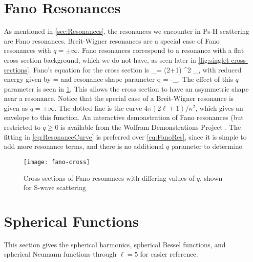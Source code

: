 \documentclass[Dissertation.tex]{subfiles}
\begin{document}
\section{Fano Resonances}
\label{sec:FanoResonances}
As mentioned in \cref{sec:Resonances}, the resonances we encounter in Ps-H
scattering are Fano resonances. Breit-Wigner resonances are a special case of Fano
resonances with $q = \pm\infty$.
Fano resonances correspond to a resonance with a flat cross section 
background, which we do not have, as seen later in \cref{fig:singlet-cross-sections}.
Fano's equation for the cross section is \cite[p.596]{Bransden2003}
\beq
\label{eq:FanoRes}
\sigma_\ell =  (2\ell+1) \sin^2 \xi_\ell {},
\eeq
with reduced energy given by
\beq
\epsilon = 
\eeq
and resonance shape parameter
\beq
q = -\cot \xi_\ell.
\eeq
The effect of this $q$ parameter is seen in \cref{fig:FanoCross}. This allows 
the cross section to have an asymmetric shape near a resonance. Notice that 
the special case of a Breit-Wigner resonance is given as $q = \pm\infty$. The 
dotted line is the curve $4 \pi (2\ell+1) / \kappa^2$, which gives an 
envelope to this function. An interactive demonstration of Fano resonances
(but restricted to $q \geq 0$ is available from the Wolfram Demonstrations
Project \cite{FanoDemo}. The fitting in \cref{eq:ResonanceCurve} is preferred
over \cref{eq:FanoRes}, since it is simple to add more resonance terms,
and there is no additional $q$ parameter to determine.

\begin{figure}
	\centering
	\texttt{[image: fano-cross]}
	\caption[Cross sections of Fano resonances]{Cross sections of Fano 
resonances with differing values of $q$, shown for S-wave scattering}
	\label{fig:FanoCross}
\end{figure}


\section{Spherical Functions}
\label{sec:SphericalFunc}
%

This section gives the spherical harmonics, spherical Bessel functions, and
spherical Neumann functions through $\ell = 5$ for easier reference.
\end{document}
